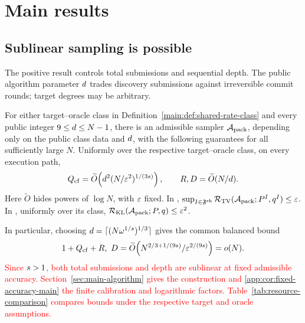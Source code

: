 \section{Main results}
\label{sec:main-results}

\subsection{Sublinear sampling is possible}
\label{sec:main-upper}

The positive result controls total submissions and sequential depth.
The public algorithm parameter $d$ trades discovery submissions
against irreversible commit rounds; target degrees may be arbitrary.

\begin{theorem}
\label{main:thm:upper-curve}
For either target--oracle class in Definition~\ref{main:def:shared-rate-class}
and every public integer $9\le d\le N-1$, there is an admissible
sampler $\mathcal A_{\mathrm{pack}}$, depending only on the public class data and
$d$, with the following guarantees for all sufficiently large $N$.
Uniformly over the respective target--oracle class, on every execution path,
\begin{equation}
 Q_{\mathrm{cf}}
 =\widetilde O\!\left(
   d^2(N/\varepsilon^2)^{1/(3s)}
 \right),
 \qquad
 R,D=\widetilde O(N/d).
 \label{main:eq:benchmark-upper}
\end{equation}
Here $\widetilde O$ hides powers of $\log N$, with $\varepsilon$ fixed.
In \HellingerCase,
$\sup_{I\in\mathfrak F^{\mathrm{sh}}}
 \mathcal R_{\mathrm{TV}}(\mathcal A_{\mathrm{pack}};P^{I},q^{I})
 \le\varepsilon$.
In \KLCase, uniformly over its class,
$\mathcal R_{\mathrm{KL}}(\mathcal A_{\mathrm{pack}};P,q)\le\varepsilon^2$.
\end{theorem}

In particular, choosing
$d=\lceil(N\omega^{1/s})^{1/3}\rceil$
gives the common balanced bound
\begin{equation}
 1+\CounterfactualQueries+\CommitRounds,\ \OracleDepth
 =\widetilde O\!\left(
 N^{2/3+1/(9\RankTailExponent)}/\TargetTolerance^{2/(9\RankTailExponent)}
 \right)=o(N).
 \label{main:eq:balanced-upper}
\end{equation}
\textcolor{red}{Since $s>1$, both total submissions and depth
are sublinear at fixed admissible accuracy.
Section~\ref{sec:main-algorithm} gives the construction and
\cref{app:cor:fixed-accuracy-main} the finite calibration and logarithmic factors.
Table~\ref{tab:resource-comparison} compares bounds under the respective
target and oracle assumptions.}

